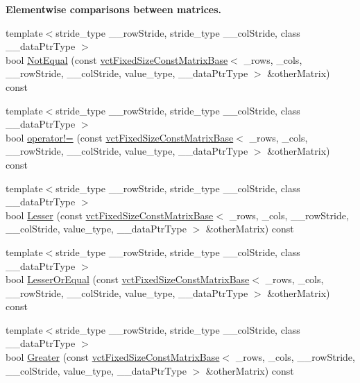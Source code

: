 \begin{Indent}{\bf Elementwise comparisons between matrices.}
\begin{DoxyCompactItemize}
\item 
{\footnotesize template$<$stride\+\_\+type \+\_\+\+\_\+row\+Stride, stride\+\_\+type \+\_\+\+\_\+col\+Stride, class \+\_\+\+\_\+data\+Ptr\+Type $>$ }\\bool \hyperlink{classvct_fixed_size_const_matrix_base_a26e8a2ddf799fe359b0df11984780514}{Not\+Equal} (const \hyperlink{classvct_fixed_size_const_matrix_base}{vct\+Fixed\+Size\+Const\+Matrix\+Base}$<$ \+\_\+rows, \+\_\+cols, \+\_\+\+\_\+row\+Stride, \+\_\+\+\_\+col\+Stride, value\+\_\+type, \+\_\+\+\_\+data\+Ptr\+Type $>$ \&other\+Matrix) const 
\item 
{\footnotesize template$<$stride\+\_\+type \+\_\+\+\_\+row\+Stride, stride\+\_\+type \+\_\+\+\_\+col\+Stride, class \+\_\+\+\_\+data\+Ptr\+Type $>$ }\\bool \hyperlink{classvct_fixed_size_const_matrix_base_ac39b9b0de05704426589029c38534731}{operator!=} (const \hyperlink{classvct_fixed_size_const_matrix_base}{vct\+Fixed\+Size\+Const\+Matrix\+Base}$<$ \+\_\+rows, \+\_\+cols, \+\_\+\+\_\+row\+Stride, \+\_\+\+\_\+col\+Stride, value\+\_\+type, \+\_\+\+\_\+data\+Ptr\+Type $>$ \&other\+Matrix) const 
\item 
{\footnotesize template$<$stride\+\_\+type \+\_\+\+\_\+row\+Stride, stride\+\_\+type \+\_\+\+\_\+col\+Stride, class \+\_\+\+\_\+data\+Ptr\+Type $>$ }\\bool \hyperlink{classvct_fixed_size_const_matrix_base_a7cc6b6429300b8aa890881823fccb014}{Lesser} (const \hyperlink{classvct_fixed_size_const_matrix_base}{vct\+Fixed\+Size\+Const\+Matrix\+Base}$<$ \+\_\+rows, \+\_\+cols, \+\_\+\+\_\+row\+Stride, \+\_\+\+\_\+col\+Stride, value\+\_\+type, \+\_\+\+\_\+data\+Ptr\+Type $>$ \&other\+Matrix) const 
\item 
{\footnotesize template$<$stride\+\_\+type \+\_\+\+\_\+row\+Stride, stride\+\_\+type \+\_\+\+\_\+col\+Stride, class \+\_\+\+\_\+data\+Ptr\+Type $>$ }\\bool \hyperlink{classvct_fixed_size_const_matrix_base_ac841e7e8a8732b7b0b96499f3c8cbaca}{Lesser\+Or\+Equal} (const \hyperlink{classvct_fixed_size_const_matrix_base}{vct\+Fixed\+Size\+Const\+Matrix\+Base}$<$ \+\_\+rows, \+\_\+cols, \+\_\+\+\_\+row\+Stride, \+\_\+\+\_\+col\+Stride, value\+\_\+type, \+\_\+\+\_\+data\+Ptr\+Type $>$ \&other\+Matrix) const 
\item 
{\footnotesize template$<$stride\+\_\+type \+\_\+\+\_\+row\+Stride, stride\+\_\+type \+\_\+\+\_\+col\+Stride, class \+\_\+\+\_\+data\+Ptr\+Type $>$ }\\bool \hyperlink{classvct_fixed_size_const_matrix_base_a1f33b761442a043221a76a6b1bc13996}{Greater} (const \hyperlink{classvct_fixed_size_const_matrix_base}{vct\+Fixed\+Size\+Const\+Matrix\+Base}$<$ \+\_\+rows, \+\_\+cols, \+\_\+\+\_\+row\+Stride, \+\_\+\+\_\+col\+Stride, value\+\_\+type, \+\_\+\+\_\+data\+Ptr\+Type $>$ \&other\+Matrix) const 

\end{DoxyCompactItemize}
\end{Indent}
